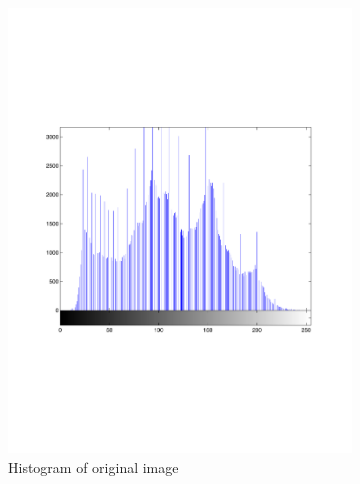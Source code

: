 \documentclass[a4paper]{article}
\begin{document}
\begin{figure}[h!]
        \begin{subfigure}[b]{0.3\textwidth}
                \centering
                \includegraphics[width=\textwidth]{q4-b-orighist}
                \caption{Histogram of original image}
                \label{fig:bhe}
        \end{subfigure}%
        ~ %
        \begin{subfigure}[b]{0.3\textwidth}
                \centering

\end{subfigure}
\end{figure}
\end{document}
